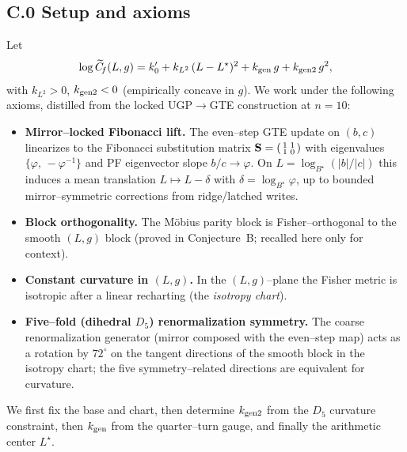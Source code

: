 \documentclass[12pt]{article}
\numberwithin{equation}{section}
\begin{document}
\bigskip
\subsection*{C.0 \; Setup and axioms}

Let
\[
\log \widetilde{C}_{\!f}(L,g)=k_0'+k_{L^2}\,(L-L^\star)^2+k_{\rm gen}\,g+k_{\rm gen2}\,g^2,
\]
with $k_{L^2}>0$, $k_{\rm gen2}<0$ (empirically concave in $g$).  We work under the following axioms, distilled from the locked UGP$\to$GTE construction at $n=10$:

\begin{itemize}
\item[\textbf{C1}] \textbf{Mirror–locked Fibonacci lift.} The even–step GTE update on $(b,c)$ linearizes to the Fibonacci substitution matrix
\(
\mathbf{S}=\begin{psmallmatrix}1&1\\1&0\end{psmallmatrix}
\)
with eigenvalues $\{\varphi,\,-\varphi^{-1}\}$ and PF eigenvector slope $b/c\to\varphi$.  On $L=\log_{B^\star}(|b|/|c|)$ this induces a mean translation $L\mapsto L-\delta$ with $\delta=\log_{B^\star}\varphi$, up to bounded mirror–symmetric corrections from ridge/latched writes.

\item[\textbf{C2}] \textbf{Block orthogonality.} The Möbius parity block is Fisher–orthogonal to the smooth $(L,g)$ block (proved in Conjecture~B; recalled here only for context).

\item[\textbf{C3}] \textbf{Constant curvature in $(L,g)$.} In the $(L,g)$–plane the Fisher metric is isotropic after a linear recharting (the \emph{isotropy chart}).

\item[\textbf{C4}] \textbf{Five–fold (dihedral $D_5$) renormalization symmetry.} The coarse renormalization generator (mirror composed with the even–step map) acts as a rotation by $72^\circ$ on the tangent directions of the smooth block in the isotropy chart; the five symmetry–related directions are equivalent for curvature.
\end{itemize}

We first fix the base and chart, then determine $k_{\rm gen2}$ from the $D_5$ curvature constraint, then $k_{\rm gen}$ from the quarter–turn gauge, and finally the arithmetic center $L^\star$.

\bigskip
\end{document}
